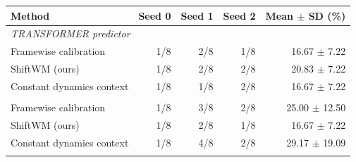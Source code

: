 \begin{tabular}{lrrrr}\toprule
Method & Seed 0 & Seed 1 & Seed 2 & Mean $\pm$ SD (\%)\\\midrule
\multicolumn{5}{l}{\emph{TRANSFORMER predictor}}\\
Framewise calibration & 1/8 & 2/8 & 1/8 & 16.67 $\pm$ 7.22\\
ShiftWM (ours) & 1/8 & 2/8 & 2/8 & 20.83 $\pm$ 7.22\\
Constant dynamics context & 1/8 & 1/8 & 2/8 & 16.67 $\pm$ 7.22\\
\addlinespace[3pt]
\multicolumn{5}{l}{\emph{GRU predictor}}\\
Framewise calibration & 1/8 & 3/8 & 2/8 & 25.00 $\pm$ 12.50\\
ShiftWM (ours) & 1/8 & 2/8 & 1/8 & 16.67 $\pm$ 7.22\\
Constant dynamics context & 1/8 & 4/8 & 2/8 & 29.17 $\pm$ 19.09\\
\addlinespace[3pt]
\bottomrule\end{tabular}
